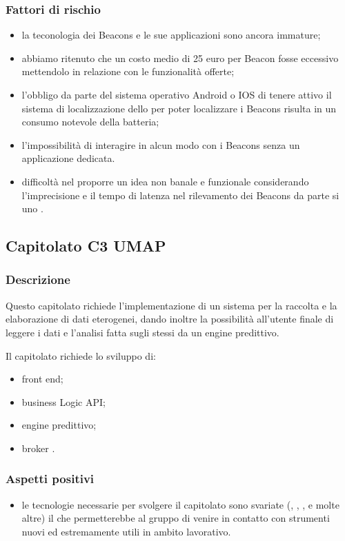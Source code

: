 \documentclass[12pt,a4paper]{article}
\begin{document}
\subsubsection{Fattori di rischio}
\begin{itemize}
\item la teconologia dei Beacons  e le sue applicazioni sono ancora immature;
\item abbiamo ritenuto che un costo medio di 25 euro per Beacon fosse eccessivo mettendolo in relazione con le funzionalità offerte;
\item l'obbligo da parte del sistema operativo Android o IOS di tenere attivo il sistema di localizzazione dello  per poter localizzare i Beacons risulta in un consumo notevole della batteria;
\item l'impossibilità di interagire in alcun modo con i Beacons senza un applicazione dedicata.
\item difficoltà nel proporre un idea non banale e funzionale considerando l'imprecisione e il tempo di latenza nel rilevamento dei Beacons da parte si uno .
\end{itemize}

\newpage
\subsection{Capitolato C3 UMAP}

\subsubsection{Descrizione}

Questo capitolato richiede l'implementazione di un sistema per la  raccolta e la elaborazione di dati eterogenei, dando inoltre la possibilità all'utente finale di leggere i dati e l'analisi fatta sugli stessi da un engine predittivo.

Il capitolato richiede lo sviluppo di:
\begin{itemize}
\item front end;
\item business Logic API; 
\item engine predittivo;
\item broker . 
\end{itemize}

\subsubsection{Aspetti positivi}
\begin{itemize}
\item le tecnologie necessarie per svolgere il capitolato sono svariate (, ,  ,  e molte altre) il che permetterebbe al gruppo di venire in contatto con strumenti nuovi ed estremamente utili in ambito lavorativo.
\end{itemize}
\end{document}
